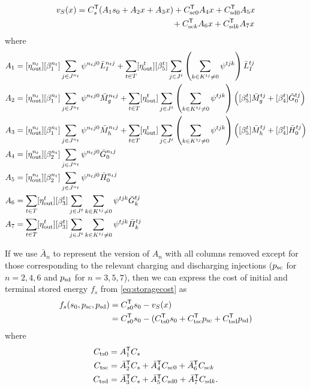 \documentclass[12pt]{article}
\newcommand{\trans}[1]{#1^{\ensuremath{\mathsf{T}}}}    %
\numberwithin{equation}{section}
\numberwithin{table}{section}
\numberwithin{figure}{section}
\begin{document}
\begin{align}
v_S(x) &= \trans{C_s} (A_1 s_0 + A_2 x + A_3 x) + \trans{C_{\rm sc0}} A_4 x + \trans{C_{\rm sd0}} A_5 x \nonumber \\
&\qquad\qquad\qquad\qquad\qquad\quad\:\, {} + \trans{C_{{\rm sc}k}} A_6 x + \trans{C_{{\rm sd}k}} A_7 x \label{eq:vs}
\end{align}
where
\begin{align}
A_1 &= [\eta^{n_t}_{\rm out}] [\beta_1^{n_t}] \sum_{j \in J^{n_t}} \psi^{n_tj0} \bar{L}_I^{n_tj} + \sum_{t \in T} [\eta^{t}_{\rm out}] [\beta_5^t] \sum_{j \in J^t} \left( \sum_{k \in K^{tj} \ne 0} \psi^{tjk} \right) \bar{L}_I^{tj} \\
A_2 &= [\eta^{n_t}_{\rm out}] [\beta_1^{n_t}] \sum_{j \in J^{n_t}} \psi^{n_tj0} \bar{M}^{n_tj}_g + \sum_{t \in T} [\eta^{t}_{\rm out}] \sum_{j \in J^t} \left(\sum_{k \in K^{tj} \ne 0} \psi^{tjk}\right) \left( [\beta_5^t] \bar{M}^{tj}_g + [\beta_4^t] \bar{G}_0^{tj} \right) \\
A_3 &= [\eta^{n_t}_{\rm out}] [\beta_1^{n_t}] \sum_{j \in J^{n_t}} \psi^{n_tj0} \bar{M}^{n_tj}_h + \sum_{t \in T} [\eta^{t}_{\rm out}] \sum_{j \in J^t} \left(\sum_{k \in K^{tj} \ne 0} \psi^{tjk} \right) \left( [\beta_5^t] \bar{M}^{tj}_h + [\beta_4^t] \bar{H}_0^{tj} \right) \\
A_4 &= [\eta^{n_t}_{\rm out}] [\beta_2^{n_t}] \sum_{j \in J^{n_t}} \psi^{n_tj0} \bar{G}_0^{n_tj} \\
A_5 &= [\eta^{n_t}_{\rm out}] [\beta_2^{n_t}] \sum_{j \in J^{n_t}} \psi^{n_tj0} \bar{H}_0^{n_tj} \\
A_6 &= \sum_{t \in T} [\eta^{t}_{\rm out}] [\beta_3^t] \sum_{j \in J^t} \sum_{k \in K^{tj} \ne 0} \psi^{tjk} \bar{G}_k^{tj} \\
A_7 &= \sum_{t \in T} [\eta^{t}_{\rm out}] [\beta_3^t] \sum_{j \in J^t} \sum_{k \in K^{tj} \ne 0} \psi^{tjk} \bar{H}_k^{tj}
\end{align}

If we use $\bar{A}_n$ to represent the version of $A_n$ with all columns removed except for those corresponding to the relevant charging and discharging injections ($p_{\rm sc}$ for $n = 2,4,6$ and $p_{\rm sd}$ for $n = 3,5,7$), then we can express the cost of initial and terminal stored energy $f_s$ from \eqref{eq:storagecost} as
\begin{align}
f_s(s_0, p_{\rm sc}, p_{\rm sd}) &= \trans{C_{s0}} s_0 - v_S(x) \nonumber \\
&= \trans{C_{s0}} s_0 - (\trans{C_{\rm ts0}} s_0 + \trans{C_{\rm tsc}} p_{\rm sc} + \trans{C_{\rm tsd}} p_{\rm sd})
\label{eq:fs}
\end{align}
where
\begin{align}
C_{\rm ts0} &= \trans{A_1} C_s \\
C_{\rm tsc} &= \trans{\bar{A}_2} C_s + \trans{\bar{A}_4} C_{\rm sc0} + \trans{\bar{A}_6} C_{{\rm sc}k} \\
C_{\rm tsd} &= \trans{\bar{A}_3} C_s + \trans{\bar{A}_5} C_{\rm sd0} + \trans{\bar{A}_7} C_{{\rm sd}k}. \label{eq:Ctsd}
\end{align}
\end{document}
